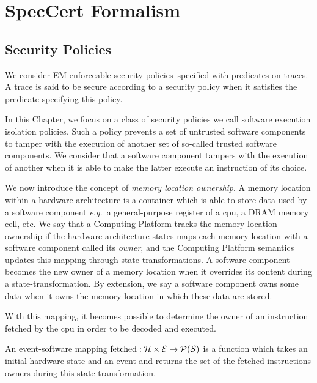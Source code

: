 \section{SpecCert Formalism} \label{sec:speccert:framework}

\subsection{Security Policies}

We consider EM-enforceable security
policies\,\cite{schneider2000enforceable,schneider2} specified with predicates
on traces.
%
A trace is said to be secure according to a security policy when it satisfies the
predicate specifying this policy.

In this Chapter, we focus on a class of security policies we call software
execution isolation policies.
%
Such a policy prevents a set of untrusted software components to tamper with the
execution of another set of so-called trusted software components.
%
We consider that a software component tampers with the execution of another when
it is able to make the latter execute an instruction of its choice.

We now introduce the concept of \textit{memory location ownership}.
%
A memory location within a hardware architecture is a container which is able to
store data used by a software component \emph{e.g.}~a general-purpose register
of a \ac{cpu}, a DRAM memory cell, etc.
%
We say that a Computing Platform tracks the memory location ownership if the
hardware architecture states maps each memory location with a software component
called its \emph{owner}, and the Computing Platform semantics updates this
mapping through state-transformations.
%
A software component becomes the new owner of a memory location when it
overrides its content during a state-transformation.
%
By extension, we say a software component owns some data when it owns the memory
location in which these data are stored.

With this mapping, it becomes possible to determine the owner of an instruction
fetched by the \ac{cpu} in order to be decoded and executed.

\begin{definition}
  \label{def:evsoft}
  An event-software mapping
  $\mathrm{fet\-ched}: \mathcal{H} \times \mathcal{E} \rightarrow \mathcal{P}(\mathcal{S})$ is
  a function which takes an initial hardware state and an event and returns the
  set of the fetched instructions owners during this state-transformation.
\end{definition}

